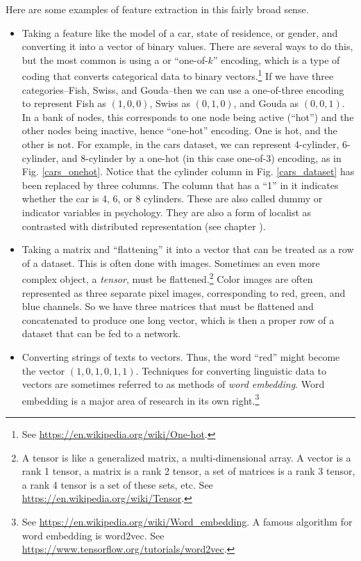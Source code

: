 Here are some examples of feature extraction in this fairly broad sense. 
\begin{itemize}
\item Taking a feature like the model of a car, state of residence, or gender, and converting it into a vector of binary values. There are several ways to do this, but the most common is using a  or ``one-of-$k$'' encoding, which is a type of coding that converts categorical data to binary vectors.\footnote{See \url{https://en.wikipedia.org/wiki/One-hot}.} If we have three categories--Fish, Swiss, and Gouda--then we can use a one-of-three encoding to represent Fish as $(1,0,0)$, Swiss as $(0,1,0)$, and Gouda as $(0,0,1)$. In a bank of nodes, this corresponds to one node being active (``hot'') and the other nodes being inactive, hence ``one-hot'' encoding. One is hot, and the other is not. For example, in the cars dataset, we can represent 4-cylinder, 6-cylinder, and 8-cylinder by a one-hot (in this case one-of-3) encoding, as in Fig. \ref{cars_onehot}. Notice that the cylinder column in Fig. \ref{cars_dataset} has been  replaced by three columns. The column that has a ``1'' in it indicates whether the car is 4, 6, or 8 cylinders. These are also called dummy or indicator variables in psychology. They are also a form of localist as contrasted with distributed representation (see chapter ).
\item Taking a matrix and ``flattening'' it into a vector that can be treated as a row of a dataset. This is often done with images. Sometimes an even more complex object, a \emph{tensor}, must be flattened.\footnote{A tensor is like a generalized matrix, a multi-dimensional array. A vector is a rank 1 tensor, a matrix is a rank 2 tensor, a set of matrices is a rank 3 tensor, a rank 4 tensor is a set of these sets, etc. See \url{https://en.wikipedia.org/wiki/Tensor}.}  Color images are often represented as three separate pixel  images, corresponding to red, green, and blue channels. So we have three matrices that must be flattened and concatenated to produce one long vector, which is then a proper row of a dataset that can be fed to a network.
\item Converting strings of texts to vectors. Thus, the word ``red'' might become the vector $(1,0,1,0,1,1)$. Techniques for converting linguistic data to vectors are sometimes referred to as methods of \emph{word embedding}. Word embedding is a major area of research in its own right.\footnote{ See \url{https://en.wikipedia.org/wiki/Word_embedding}. A famous algorithm for word embedding is word2vec. See \url{https://www.tensorflow.org/tutorials/word2vec}.}

\end{itemize}
